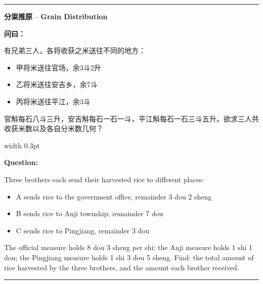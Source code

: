 \documentclass[10pt,a4paper]{article}
\newcommand{\cnlabel}[1]{\textcolor{labelcolor}{\textbf{#1}}}
\newcommand{\enlabel}[1]{\textcolor{labelcolor}{\textbf{#1}}}
\newenvironment{problemsection}{%
  \medskip\par\noindent\textcolor{rulecolor}{\rule{\textwidth}{0.4pt}}\par\smallskip%
}{\par\smallskip\noindent\textcolor{rulecolor}{\rule{\textwidth}{0.4pt}}\par\medskip}
\begin{document}
\begin{problemsection}

\noindent\begin{minipage}[t]{\textwidth}
\begin{center}
\textbf{分粜推原} -- \textbf{Grain Distribution}
\end{center}
\end{minipage}

\vspace{0.3em}

\noindent\begin{minipage}[t]{0.47\textwidth}
\begin{flushleft}
\small
\cnlabel{问曰：}

有兄弟三人，各将收获之米送往不同的地方：
\begin{itemize}[leftmargin=*,nosep,topsep=2pt]
  \item 甲将米送往官场，余3斗2升
  \item 乙将米送往安吉乡，余7斗
  \item 丙将米送往平江，余3斗
\end{itemize}

官斛每石八斗三升，安吉斛每石一石一斗，平江斛每石一石三斗五升。欲求三人共收获米数以及各自分米数几何？
\end{flushleft}
\end{minipage}%
\hfill\vrule width 0.3pt\hfill%
\begin{minipage}[t]{0.47\textwidth}
\begin{flushleft}
\small
\enlabel{Question:}

Three brothers each send their harvested rice to different places:
\begin{itemize}[leftmargin=*,nosep,topsep=2pt]
  \item A sends rice to the government office, remainder 3 dou 2 sheng
  \item B sends rice to Anji township, remainder 7 dou
  \item C sends rice to Pingjiang, remainder 3 dou
\end{itemize}

The official measure holds 8 dou 3 sheng per shi; the Anji measure holds 1 shi 1 dou; the Pingjiang measure holds 1 shi 3 dou 5 sheng. Find: the total amount of rice harvested by the three brothers, and the amount each brother received.
\end{flushleft}
\end{minipage}

\vspace{0.3em}


\end{problemsection}
\end{document}
